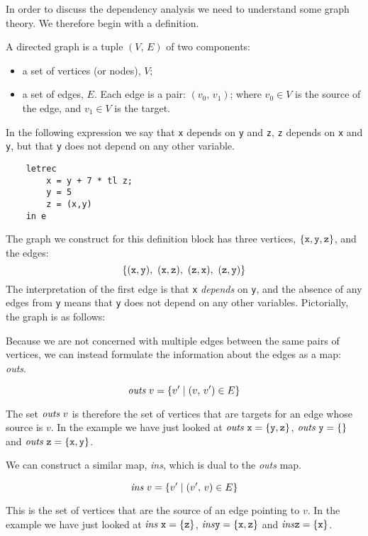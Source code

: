In order to discuss the dependency analysis we need to understand some
graph theory. We therefore begin with a definition.
\begin{definition}
A directed graph is a tuple $(V,\,E)$ of two components:
\begin{itemize}
\item a set of vertices (or nodes), $V$;
\item a set of edges, $E$. Each edge is a pair: $(v_0,\,v_1)$; where
$v_0\in V$ is the source of the edge, and $v_1\in V$ is the target.
\end{itemize}
\end{definition}
In the following expression we say that \mbox{\tt x} depends on \mbox{\tt y} and \mbox{\tt z}, \mbox{\tt z}
depends on \mbox{\tt x} and \mbox{\tt y}, but that \mbox{\tt y} does not depend on any other
variable.
\begin{verbatim}
    letrec
        x = y + 7 * tl z;
        y = 5
        z = (x,y)
    in e
\end{verbatim}
The graph we construct for this definition block has three vertices,
$\{\mbox{\tt x}, \mbox{\tt y}, \mbox{\tt z}\}$, and the edges:
\[
  \{(\mbox{\tt x}, \mbox{\tt y}),~(\mbox{\tt x}, \mbox{\tt z}),~(\mbox{\tt z}, \mbox{\tt x}),~(\mbox{\tt z}, \mbox{\tt y})\}
\]
The interpretation of the first edge is that \mbox{\tt x} {\em depends\/} on \mbox{\tt y},
and the absence of any edges from \mbox{\tt y} means that \mbox{\tt y} does not depend
on any other variables. Pictorially, the graph is as follows:
\begin{center}

\end{center}
Because we are not concerned with multiple edges between the same
pairs of vertices, we can instead formulate the information about the
edges as a map: \mbox{\it outs}.
\begin{definition}\mbox{}
\[
 \mbox{\it outs} ~ v = \{v' \mathrel{|} (v,\,v') \in E\}
\]
\end{definition}
The set $\mbox{\it outs}~ v$ is therefore the set of vertices that are
targets for an edge whose source is $v$.  In the example we have just
looked at $\mbox{\it outs}~ \mbox{\tt x} = \{\mbox{\tt y},\mbox{\tt z}\}$, $\mbox{\it outs}~ \mbox{\tt y}
= \{\}$ and $\mbox{\it outs}~ \mbox{\tt z} = \{\mbox{\tt x},\mbox{\tt y}\}$.

We can construct a similar map, \mbox{\it ins}, which is dual to the
\mbox{\it outs} map.

\begin{definition}\mbox{}
\[
 \mbox{\it ins} ~ v = \{v' \mathrel{|} (v',\,v) \in E\}
\]
\end{definition}
This is the set of vertices that are the source of an edge pointing to
$v$. In the example we have just looked at $\mbox{\it ins}~ \mbox{\tt x} =
\{\mbox{\tt z}\}$, $\mbox{\it ins\/} \mbox{\tt y} = \{\mbox{\tt x},\mbox{\tt z}\}$ and $\mbox{\it ins\/}
\mbox{\tt z} = \{\mbox{\tt x}\}$.

